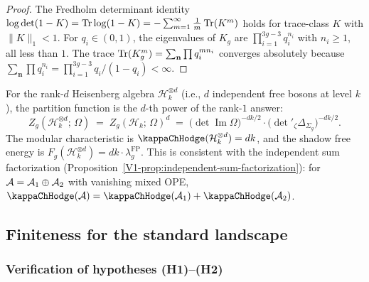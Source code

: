 \begin{proof}
The Fredholm determinant identity $\log\det(1 - K) = \operatorname{Tr}\log(1 - K) = -\sum_{m=1}^\infty \frac{1}{m}\operatorname{Tr}(K^m)$ holds for trace-class $K$ with $\|K\|_1 < 1$. For $q_i \in (0,1)$, the eigenvalues of $K_g$ are $\prod_{i=1}^{3g-3} q_i^{n_i}$ with $n_i \geq 1$, all less than $1$. The trace $\operatorname{Tr}(K_g^m) = \sum_{\mathbf{n}} \prod q_i^{mn_i}$ converges absolutely because $\sum_{\mathbf{n}} \prod q_i^{n_i} = \prod_{i=1}^{3g-3} q_i/(1-q_i) < \infty$.
\end{proof}

\begin{remark}
For the rank-$d$ Heisenberg algebra $\mathcal{H}_k^{\otimes d}$ (i.e., $d$ independent free bosons at level $k$), the partition function is the $d$-th power of the rank-$1$ answer:
\begin{equation}%
Z_g(\mathcal{H}_k^{\otimes d};\,\Omega) \;=\; Z_g(\mathcal{H}_k;\,\Omega)^d \;=\; \bigl(\det\operatorname{Im}\Omega\bigr)^{-dk/2} \cdot \bigl(\det{}'_\zeta\Delta_{\Sigma_g}\bigr)^{-dk/2}.
\end{equation}
The modular characteristic is $\kappaChHodge(\mathcal{H}_k^{\otimes d}) = dk$, and the shadow free energy is $F_g(\mathcal{H}_k^{\otimes d}) = dk \cdot \lambda_g^{\mathrm{FP}}$. This is consistent with the independent sum factorization (Proposition~\ref{V1-prop:independent-sum-factorization}): for $\mathcal{A} = \mathcal{A}_1 \oplus \mathcal{A}_2$ with vanishing mixed OPE, $\kappaChHodge(\cA) = \kappaChHodge(\cA_1) + \kappaChHodge(\cA_2)$.
\end{remark}



\subsection{Finiteness for the standard landscape}
\label{subsec:thqg-I-standard-landscape}

\subsubsection{Verification of hypotheses (H1)--(H2)}

